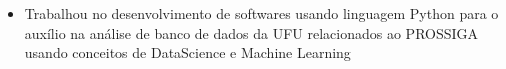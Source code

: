 \documentclass[10pt,a4paper,ragged2e]{altacv}
\begin{document}
\divider



\begin{itemize}
\item Trabalhou no desenvolvimento de softwares usando linguagem Python para o auxílio na análise de banco de dados da UFU relacionados ao PROSSIGA usando conceitos de DataScience e Machine Learning
\end{itemize}



 
  \divider


 
  \divider
 

 



\clearpage








\end{document}
